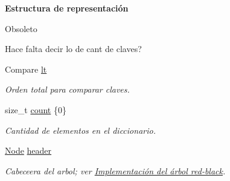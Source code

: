 \begin{Indent}{\bf Estructura de representación}
{\begin{DoxyRefDesc}{Obsoleto}
\item[\hyperlink{deprecated__deprecated000021}{Obsoleto}]Hace falta decir lo de cant de claves?\end{DoxyRefDesc}
}\begin{DoxyCompactItemize}
\item 
Compare \hyperlink{classaed2_1_1map_a0e5be36fae0693e4665bd2a615e7550a_a0e5be36fae0693e4665bd2a615e7550a}{lt}
\begin{DoxyCompactList}\small\item\em Orden total para comparar claves. \end{DoxyCompactList}\item 
size\+\_\+t \hyperlink{classaed2_1_1map_a44236c4f16cdc20a10759862b198bde4_a44236c4f16cdc20a10759862b198bde4}{count} \{0\}
\begin{DoxyCompactList}\small\item\em Cantidad de elementos en el diccionario. \end{DoxyCompactList}\item 
\hyperlink{structaed2_1_1map_1_1Node}{Node} \hyperlink{classaed2_1_1map_a92d93f905c8ad73fba18fdc7e8915cce_a92d93f905c8ad73fba18fdc7e8915cce}{header}
\begin{DoxyCompactList}\small\item\em Cabeceera del arbol; ver \hyperlink{Implementacion}{Implementación del árbol red-\/black}. \end{DoxyCompactList}\end{DoxyCompactItemize}
\end{Indent}
